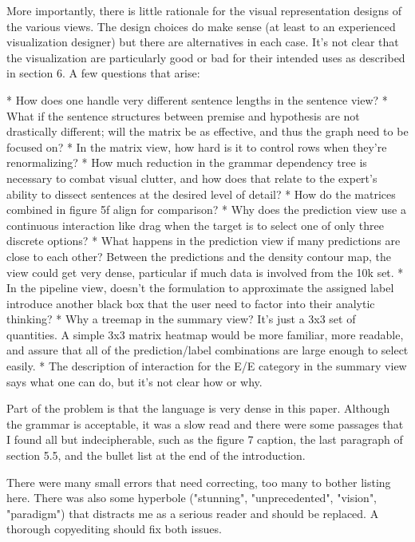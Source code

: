 More importantly, there is little rationale for the visual representation designs of the various views. The design choices do make sense (at least to an experienced visualization designer) but there are alternatives in each case. It's not clear that the visualization are particularly good or bad for their intended uses as described in section 6. A few questions that arise:

* How does one handle very different sentence lengths in the sentence view?
* What if the sentence structures between premise and hypothesis are not drastically different; will the matrix be as effective, and thus the graph need to be focused on?
* In the matrix view, how hard is it to control rows when they're renormalizing?
* How much reduction in the grammar dependency tree is necessary to combat visual clutter, and how does that relate to the expert's ability to dissect sentences at the desired level of detail?
* How do the matrices combined in figure 5f align for comparison?
* Why does the prediction view use a continuous interaction like drag when the target is to select one of only three discrete options?
* What happens in the prediction view if many predictions are close to each other? Between the predictions and the density contour map, the view could get very dense, particular if much data is involved from the 10k set.
* In the pipeline view, doesn't the formulation to approximate the assigned label introduce another black box that the user need to factor into their analytic thinking?
* Why a treemap in the summary view? It's just a 3x3 set of quantities. A simple 3x3 matrix heatmap would be more familiar, more readable, and assure that all of the prediction/label combinations are large enough to select easily.
* The description of interaction for the E/E category in the summary view says what one can do, but it's not clear how or why.

Part of the problem is that the language is very dense in this paper. Although the grammar is acceptable, it was a slow read and there were some passages that I found all but indecipherable, such as the figure 7 caption, the last paragraph of section 5.5, and the bullet list at the end of the introduction.

There were many small errors that need correcting, too many to bother listing here. There was also some hyperbole ("stunning", "unprecedented", "vision", "paradigm") that distracts me as a serious reader and should be replaced. A thorough copyediting should fix both issues.

